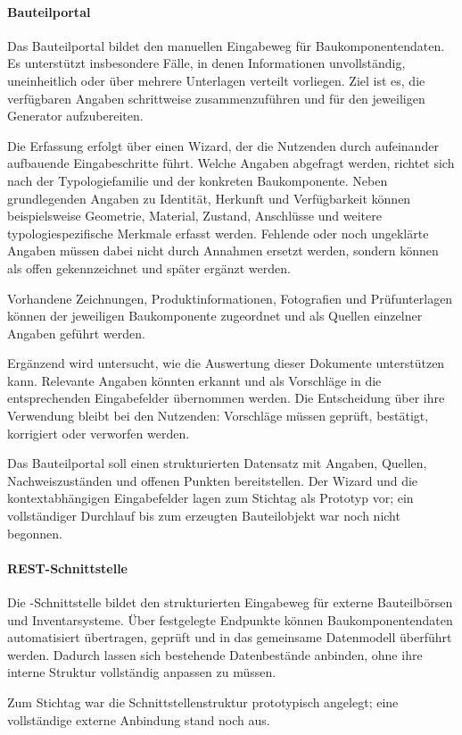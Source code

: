 \documentclass[type=zwischenbericht]{zukunftbau}
\begin{document}
\begin{SemioNest}
\paragraph{Bauteilportal}
Das Bauteilportal bildet den manuellen Eingabeweg für Baukomponentendaten. Es unterstützt insbesondere Fälle, in denen Informationen unvollständig, uneinheitlich oder über mehrere Unterlagen verteilt vorliegen. Ziel ist es, die verfügbaren Angaben schrittweise zusammenzuführen und für den jeweiligen Generator aufzubereiten.

Die Erfassung erfolgt über einen Wizard, der die Nutzenden durch aufeinander aufbauende Eingabeschritte führt. Welche Angaben abgefragt werden, richtet sich nach der Typologiefamilie und der konkreten Baukomponente. Neben grundlegenden Angaben zu Identität, Herkunft und Verfügbarkeit können beispielsweise Geometrie, Material, Zustand, Anschlüsse und weitere typologiespezifische Merkmale erfasst werden. Fehlende oder noch ungeklärte Angaben müssen dabei nicht durch Annahmen ersetzt werden, sondern können als offen gekennzeichnet und später ergänzt werden.

Vorhandene Zeichnungen, Produktinformationen, Fotografien und Prüfunterlagen können der jeweiligen Baukomponente zugeordnet und als Quellen einzelner Angaben geführt werden.

Ergänzend wird untersucht, wie  die Auswertung dieser Dokumente unterstützen kann. Relevante Angaben könnten erkannt und als Vorschläge in die entsprechenden Eingabefelder übernommen werden. Die Entscheidung über ihre Verwendung bleibt bei den Nutzenden: Vorschläge müssen geprüft, bestätigt, korrigiert oder verworfen werden.

Das Bauteilportal soll einen strukturierten Datensatz mit Angaben, Quellen, Nachweiszuständen und offenen Punkten bereitstellen. Der Wizard und die kontextabhängigen Eingabefelder lagen zum Stichtag als Prototyp vor; ein vollständiger Durchlauf bis zum erzeugten Bauteilobjekt war noch nicht begonnen.

\paragraph{REST-Schnittstelle}
Die -Schnittstelle bildet den strukturierten Eingabeweg für externe Bauteilbörsen und Inventarsysteme. Über festgelegte Endpunkte können Baukomponentendaten automatisiert übertragen, geprüft und in das gemeinsame Datenmodell überführt werden. Dadurch lassen sich bestehende Datenbestände anbinden, ohne ihre interne Struktur vollständig anpassen zu müssen.

Zum Stichtag war die Schnittstellenstruktur prototypisch angelegt; eine vollständige externe Anbindung stand noch aus.
\end{SemioNest}
\end{document}
